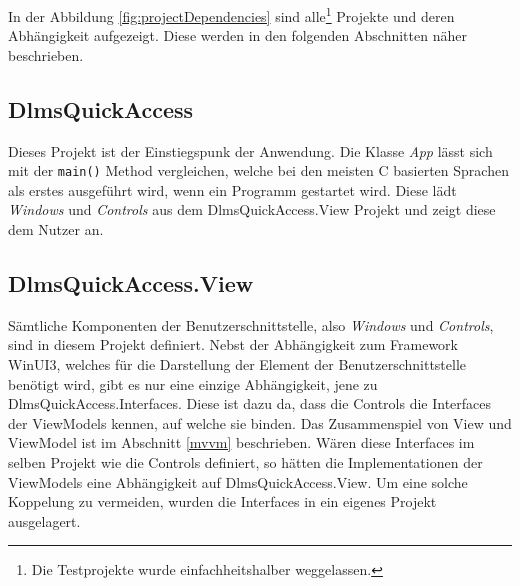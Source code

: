 In der Abbildung \ref{fig:projectDependencies} sind alle\footnote{Die Testprojekte wurde einfachheitshalber weggelassen.} Projekte und deren Abhängigkeit aufgezeigt.
Diese werden in den folgenden Abschnitten näher beschrieben.

\subsection{DlmsQuickAccess}
Dieses Projekt ist der Einstiegspunk der Anwendung.
Die Klasse \textit{App} lässt sich mit der \texttt{main()} Method vergleichen, welche bei den meisten C basierten Sprachen als erstes ausgeführt wird, wenn ein Programm gestartet wird.
Diese lädt \textit{Windows} und \textit{Controls} aus dem DlmsQuickAccess.View Projekt und zeigt diese dem Nutzer an.



\subsection{DlmsQuickAccess.View}
Sämtliche Komponenten der Benutzerschnittstelle, also \textit{Windows} und \textit{Controls}, sind in diesem Projekt definiert. 
Nebst der Abhängigkeit zum Framework WinUI3, welches für die Darstellung der Element der Benutzerschnittstelle benötigt wird, gibt es nur eine einzige Abhängigkeit, jene zu DlmsQuickAccess.Interfaces.
Diese ist dazu da, dass die Controls die Interfaces der ViewModels kennen, auf welche sie binden.
Das Zusammenspiel von View und ViewModel ist im Abschnitt \ref{mvvm} beschrieben.
Wären diese Interfaces im selben Projekt wie die Controls definiert, so hätten die Implementationen der ViewModels eine Abhängigkeit auf DlmsQuickAccess.View.
Um eine solche Koppelung zu vermeiden, wurden die Interfaces in ein eigenes Projekt ausgelagert.


